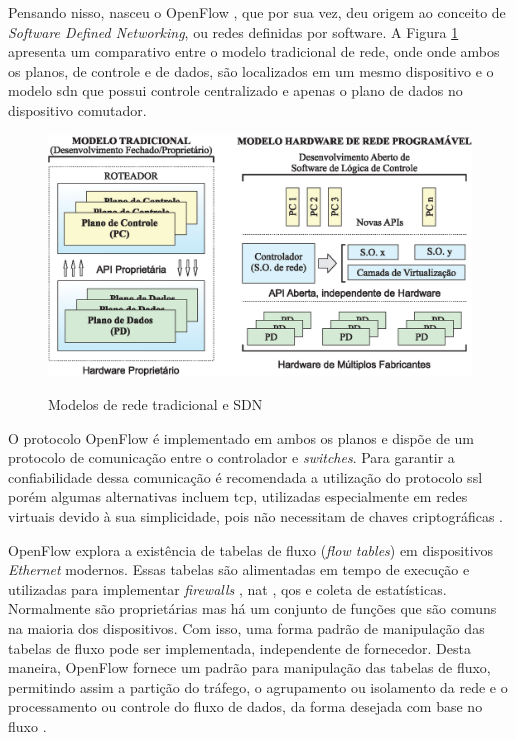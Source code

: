 Pensando nisso, nasceu o OpenFlow \cite{McKeown:2008}, que por sua vez, deu origem ao conceito de \textit{Software Defined Networking}, ou redes definidas por software. A Figura \ref{fig:arch-old-sdn} apresenta um comparativo entre o modelo tradicional de rede, onde onde ambos os planos, de controle e de dados, são localizados em um mesmo dispositivo e o modelo \gls{sdn} que possui controle centralizado e apenas o plano de dados no dispositivo comutador.

\begin{figure}[H]
  \centering
  \caption{Modelos de rede tradicional e SDN}
  \includegraphics[width=.80\textwidth]{images/arch-old-sdn.eps}
  \label{fig:arch-old-sdn}
\end{figure}
\FloatBarrier

O protocolo OpenFlow é implementado em ambos os planos e dispõe de um protocolo de comunicação entre o controlador e \textit{switches}. Para garantir a confiabilidade dessa comunicação é recomendada a utilização do protocolo \gls{ssl} \cite{RFC6101} porém algumas alternativas incluem \gls{tcp}, utilizadas especialmente em redes virtuais devido à sua simplicidade, pois não necessitam de chaves criptográficas \cite{Rothenberg:2010}.

OpenFlow explora a existência de tabelas de fluxo (\textit{flow tables}) em dispositivos \textit{Ethernet} modernos. Essas tabelas são alimentadas em tempo de execução e utilizadas para implementar \textit{firewalls} \cite{Oppliger:1997}, \gls{nat} \cite{RFC3022}, \gls{qos} \cite{Aurrecoechea:1998} e coleta de estatísticas. Normalmente são proprietárias mas há um conjunto de funções que são comuns na maioria dos dispositivos. Com isso, uma forma padrão de manipulação das tabelas de fluxo pode ser implementada, independente de fornecedor. Desta maneira, OpenFlow fornece um padrão para manipulação das tabelas de fluxo, permitindo assim a partição do tráfego, o agrupamento ou isolamento da rede e o processamento ou controle do fluxo de dados, da forma desejada com base no fluxo \cite{Kontesidou:2009}.

